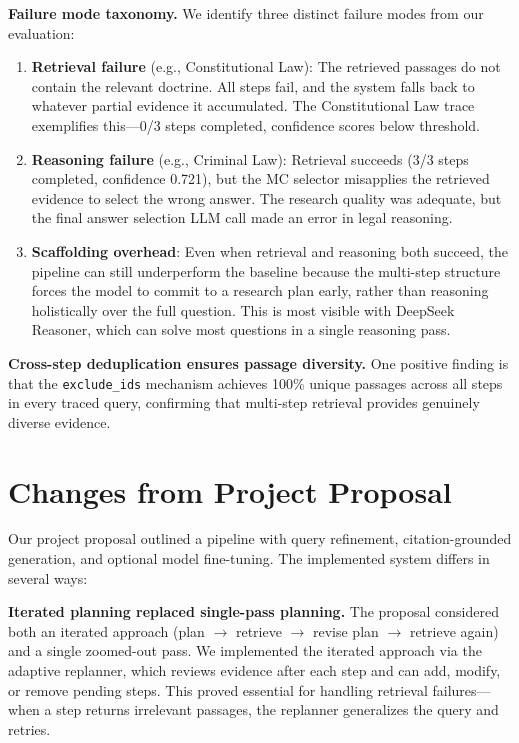 \documentclass{article}
\begin{document}
\textbf{Failure mode taxonomy.}
We identify three distinct failure modes from our evaluation:
\begin{enumerate}[leftmargin=*,nosep]
    \item \textbf{Retrieval failure} (e.g., Constitutional Law): The retrieved passages do not contain the relevant doctrine. All steps fail, and the system falls back to whatever partial evidence it accumulated. The Constitutional Law trace exemplifies this---0/3 steps completed, confidence scores below threshold.
    \item \textbf{Reasoning failure} (e.g., Criminal Law): Retrieval succeeds (3/3 steps completed, confidence 0.721), but the MC selector misapplies the retrieved evidence to select the wrong answer. The research quality was adequate, but the final answer selection LLM call made an error in legal reasoning.
    \item \textbf{Scaffolding overhead}: Even when retrieval and reasoning both succeed, the pipeline can still underperform the baseline because the multi-step structure forces the model to commit to a research plan early, rather than reasoning holistically over the full question. This is most visible with DeepSeek Reasoner, which can solve most questions in a single reasoning pass.
\end{enumerate}

\textbf{Cross-step deduplication ensures passage diversity.}
One positive finding is that the \texttt{exclude\_ids} mechanism achieves 100\% unique passages across all steps in every traced query, confirming that multi-step retrieval provides genuinely diverse evidence.

\section{Changes from Project Proposal}

Our project proposal outlined a pipeline with query refinement, citation-grounded generation, and optional model fine-tuning. The implemented system differs in several ways:

\textbf{Iterated planning replaced single-pass planning.}
The proposal considered both an iterated approach (plan $\rightarrow$ retrieve $\rightarrow$ revise plan $\rightarrow$ retrieve again) and a single zoomed-out pass. We implemented the iterated approach via the adaptive replanner, which reviews evidence after each step and can add, modify, or remove pending steps. This proved essential for handling retrieval failures---when a step returns irrelevant passages, the replanner generalizes the query and retries.
\end{document}
